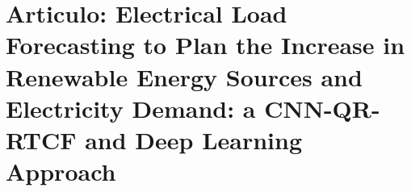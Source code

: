 \section{Articulo: Electrical Load Forecasting to Plan the Increase in Renewable Energy Sources and Electricity Demand: a CNN-QR-RTCF and Deep Learning Approach}

